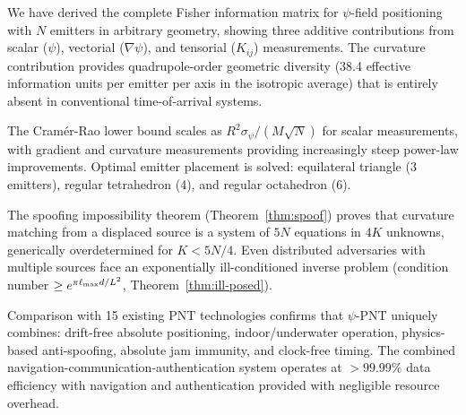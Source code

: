 \documentclass[twocolumn,superscriptaddress,prd,nofootinbib]{revtex4-2}
\begin{document}
We have derived the complete Fisher information matrix for $\psi$-field
positioning with $N$ emitters in arbitrary geometry, showing three
additive contributions from scalar ($\psi$), vectorial ($\nabla\psi$),
and tensorial ($K_{ij}$) measurements. The curvature contribution
provides quadrupole-order geometric diversity (38.4 effective information
units per emitter per axis in the isotropic average) that is entirely
absent in conventional time-of-arrival systems.

The Cram\'er-Rao lower bound scales as $R^2\sigma_\psi/(M\sqrt{N})$ for
scalar measurements, with gradient and curvature measurements providing
increasingly steep power-law improvements. Optimal emitter placement is
solved: equilateral triangle (3 emitters), regular tetrahedron (4), and
regular octahedron (6).

The spoofing impossibility theorem (Theorem~\ref{thm:spoof}) proves that
curvature matching from a displaced source is a system of $5N$ equations
in $4K$ unknowns, generically overdetermined for $K < 5N/4$. Even
distributed adversaries with multiple sources face an exponentially
ill-conditioned inverse problem (condition number $\geq e^{\pi\ell_{\rm max}d/L^2}$,
Theorem~\ref{thm:ill-posed}).

Comparison with 15 existing PNT technologies confirms that $\psi$-PNT
uniquely combines: drift-free absolute positioning, indoor/underwater
operation, physics-based anti-spoofing, absolute jam immunity, and
clock-free timing. The combined navigation-communication-authentication
system operates at $>99.99\%$ data efficiency with navigation and
authentication provided with negligible resource overhead.
\end{document}

